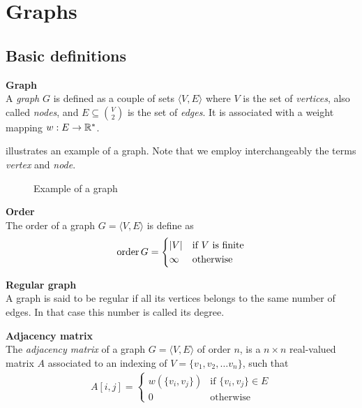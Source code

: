 \section{Graphs}

\subsection{Basic definitions}

\begin{definition}\textbf{Graph}\\
A \emph{graph} $G$ is defined as a couple of sets $\langle V,E \rangle$ where $V$ is the set of \emph{vertices}, also called \emph{nodes}, and $E \subseteq\binom{V}{2}$ is the set of \emph{edges}. It is associated with a weight mapping $w: E \rightarrow \mathbb{R}^*$.
\end{definition}

 illustrates an example of a graph. Note that we employ interchangeably the terms \emph{vertex} and \emph{node}.

\begin{figure}[H]
\centering
{}
\caption{Example of a graph}
\label{fig:graph}
\end{figure}

\begin{definition}\textbf{Order}\\
The order of a graph $G = \langle V,E \rangle$ is define as
\begin{gather*}
\operatorname{order}{G} = \begin{cases} |V| & \text{if $V$ is finite}\\ \infty & \text{otherwise} \end{cases} 
\end{gather*}
\end{definition}

\begin{definition}\textbf{Regular graph}\\
A graph is said to be regular if all its vertices belongs to the same number of edges. In that case this number is called its degree.
\end{definition}

\begin{definition}\textbf{Adjacency matrix}\\
The \emph{adjacency matrix} of a graph $G = \langle V,E \rangle$ of order $n$, is a $n \times n$ real-valued matrix $A$ associated to an indexing of $V = \{v_1, v_2, \ldots v_n\}$, such that
\begin{gather*}
A[i,j] =
 \begin{cases}
   w\left(\{v_i,v_j\}\right) & \text{if } \{v_i,v_j\} \in E \\
   0 & \text{otherwise}
 \end{cases}
\end{gather*}
 \end{definition}

